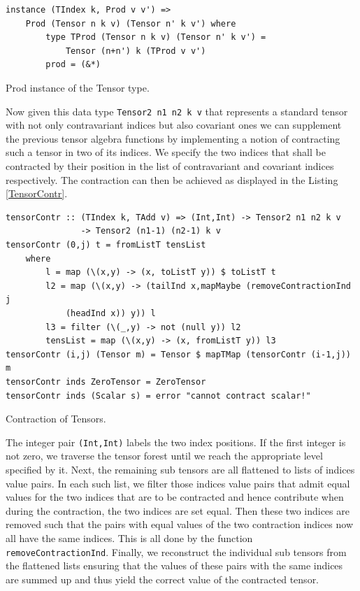 \documentclass[a4paper,12pt, DIV=14, BCOR=5mm, twoside, headsepline, numbers=noenddot]{scrbook}
\begin{document}
\begin{listing}[hbt!]
\begin{verbatim}
instance (TIndex k, Prod v v') => 
    Prod (Tensor n k v) (Tensor n' k v') where
        type TProd (Tensor n k v) (Tensor n' k v') = 
            Tensor (n+n') k (TProd v v')
        prod = (&*)
\end{verbatim} 
\caption{Prod instance of the Tensor type.}\label{TensProd}
\end{listing}

Now given this data type \texttt{Tensor2 n1 n2 k v} that represents a standard tensor with not only contravariant indices but also covariant ones we can supplement the previous tensor algebra functions by implementing a notion of contracting such a tensor in two of its indices.
We specify the two indices that shall be contracted by their position in the list of contravariant and covariant indices respectively. The contraction can then be achieved as displayed in the Listing \ref{TensorContr}.

\begin{listing}[hbt!] 
\begin{verbatim}
tensorContr :: (TIndex k, TAdd v) => (Int,Int) -> Tensor2 n1 n2 k v
               -> Tensor2 (n1-1) (n2-1) k v
tensorContr (0,j) t = fromListT tensList
    where
        l = map (\(x,y) -> (x, toListT y)) $ toListT t
        l2 = map (\(x,y) -> (tailInd x,mapMaybe (removeContractionInd j
            (headInd x)) y)) l
        l3 = filter (\(_,y) -> not (null y)) l2
        tensList = map (\(x,y) -> (x, fromListT y)) l3
tensorContr (i,j) (Tensor m) = Tensor $ mapTMap (tensorContr (i-1,j)) m
tensorContr inds ZeroTensor = ZeroTensor
tensorContr inds (Scalar s) = error "cannot contract scalar!"
\end{verbatim} 
\caption{Contraction of Tensors.}\label{TensorContr}
\end{listing}

The integer pair \texttt{(Int,Int)} labels the two index positions. If the first integer is not zero, we traverse the tensor forest until we reach the appropriate level specified by it. Next, the remaining sub tensors are all flattened to lists of indices value pairs. In each such list, we filter those indices value pairs that admit equal values for the two indices that are to be contracted and hence contribute when during the contraction, the two indices are set equal. Then these two indices are removed such that the pairs with equal values of the two contraction indices now all have the same indices. This is all done by the function \texttt{removeContractionInd}. Finally, we reconstruct the individual sub tensors from the flattened lists ensuring that the values of these pairs with the same indices are summed up and thus yield the correct value of the contracted tensor. 
\end{document}
